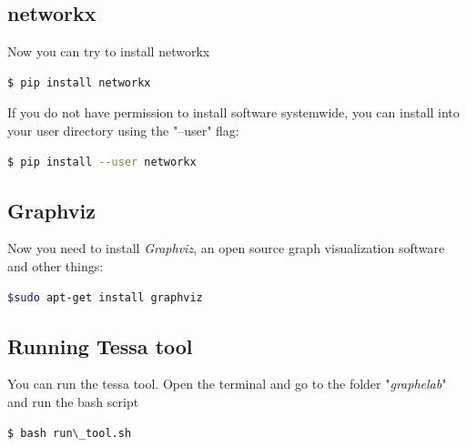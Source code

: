 \subsection{networkx}
Now you can try to install networkx\\
\begin{lstlisting}[language=bash]
$ pip install networkx
\end{lstlisting}


If you do not have permission to install software systemwide, you can install into your user directory using the "--user" flag:\\
\begin{lstlisting}[language=bash]
$ pip install --user networkx
\end{lstlisting}

\subsection{Graphviz}
Now you need to install \textit{Graphviz}, an open source graph visualization software and other things:\\
\begin{lstlisting}[language=bash]
$sudo apt-get install graphviz
\end{lstlisting}


\subsection{Running Tessa tool}
You can run the tessa tool.
Open the terminal and go to the folder "\textit{graphelab}" and run the bash script\\
\begin{lstlisting}[language=bash]
$ bash run\_tool.sh
\end{lstlisting}


